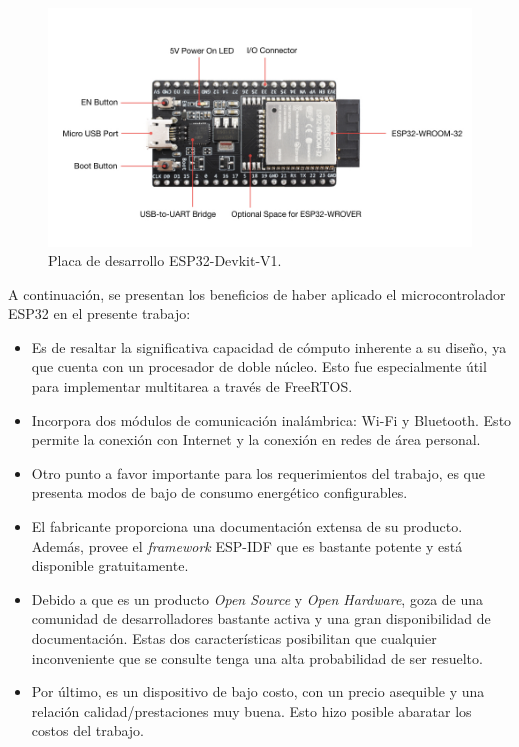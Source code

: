 \begin{figure}[htbp]
	\centering
	\includegraphics[width=1\textwidth]{./Figures/ESP32.jpg}
	\caption{Placa de desarrollo ESP32-Devkit-V1\protect\footnotemark.}
        
	\label{fig:ESP32}
\end{figure}

A continuación, se presentan los beneficios de haber aplicado el microcontrolador ESP32 en el presente trabajo:

\begin{itemize}
    \item Es de resaltar la significativa capacidad de cómputo inherente a su diseño, ya que cuenta con un procesador de doble núcleo. Esto fue especialmente útil para implementar multitarea a través de FreeRTOS.
    \item Incorpora dos módulos de comunicación inalámbrica: Wi-Fi y Bluetooth. Esto permite la conexión con Internet y la conexión en redes de área personal. 
    \item Otro punto a favor importante para los requerimientos del trabajo, es que presenta modos de bajo de consumo energético configurables. 
    \item El fabricante proporciona una documentación extensa de su producto. Además, provee el \textit{framework} ESP-IDF que es bastante potente y está disponible gratuitamente.  
    \item Debido a que es un producto \textit{Open Source} y \textit{Open Hardware}, goza de una comunidad de desarrolladores bastante activa y una gran disponibilidad de documentación. Estas dos características posibilitan que cualquier inconveniente que se consulte tenga una alta probabilidad de ser resuelto.  
    \item Por último, es un dispositivo de bajo costo, con un precio asequible y una relación calidad/prestaciones muy buena. Esto hizo posible abaratar los costos del trabajo. 
\end{itemize}


